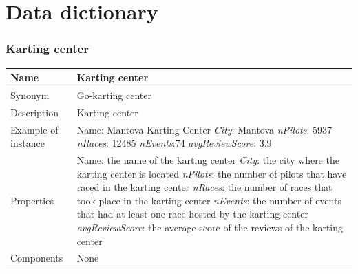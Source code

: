 \documentclass{beamer}
\begin{document}
\section*{Data dictionary}
\begin{frame}
\frametitle{Karting center}


\begin{table}
\tiny
\begin{tabular}{|p{2cm}|p{6cm}|}
\hline
Name & \textbf{Karting center} \\
\hline
Synonym & Go-karting center \\
\hline
Description & Karting center \\
\hline
Example of instance & 
Name: Mantova Karting Center \newline
\textit{City}: Mantova \newline
\textit{nPilots}: 5937 \newline
\textit{nRaces}: 12485 \newline
\textit{nEvents}:74 \newline
\textit{avgReviewScore}: 3.9 \\
\hline
Properties & 
Name: the name of the karting center\newline
\textit{City}: the city where the karting center is located\newline
\textit{nPilots}: the number of pilots that have raced in the karting center \newline
\textit{nRaces}: the number of races that took place in the karting center \newline
\textit{nEvents}: the number of events that had at least one race hosted by the karting center \newline
\textit{avgReviewScore}: the average score of the reviews of the karting center \\
\hline
Components & None \\
\hline
\end{tabular}
\end{table}

\end{frame}
\end{document}
